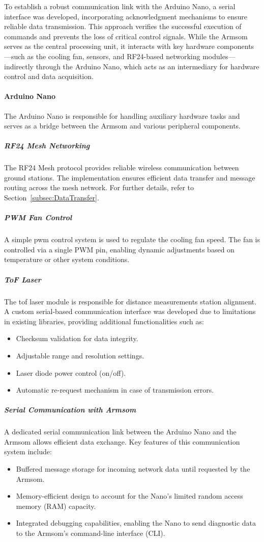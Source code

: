 To establish a robust communication link with the Arduino Nano, a serial interface was developed, incorporating acknowledgment mechanisms to ensure reliable data transmission. This approach verifies the successful execution of commands and prevents the loss of critical control signals. While the Armsom serves as the central processing unit, it interacts with key hardware components—such as the cooling fan, sensors, and RF24-based networking modules—indirectly through the Arduino Nano, which acts as an intermediary for hardware control and data acquisition.

\paragraph{Arduino Nano}
The Arduino Nano is responsible for handling auxiliary hardware tasks and serves as a bridge between the Armsom and various peripheral components.

\subparagraph{RF24 Mesh Networking}
The RF24 Mesh protocol provides reliable wireless communication between ground stations. The implementation ensures efficient data transfer and message routing across the mesh network. For further details, refer to Section~\ref{subsec:DataTransfer}.

\subparagraph{PWM Fan Control}
A simple \acrshort{pwm} control system is used to regulate the cooling fan speed. The fan is controlled via a single PWM pin, enabling dynamic adjustments based on temperature or other system conditions.

\subparagraph{ToF Laser}
The \acrshort{tof} laser module is responsible for distance measurements station alignment. A custom serial-based communication interface was developed due to limitations in existing libraries, providing additional functionalities such as:
\begin{itemize}
	\item Checksum validation for data integrity.
	\item Adjustable range and resolution settings.
	\item Laser diode power control (on/off).
	\item Automatic re-request mechanism in case of transmission errors.
\end{itemize}

\subparagraph{Serial Communication with Armsom}
A dedicated serial communication link between the Arduino Nano and the Armsom allows efficient data exchange. Key features of this communication system include:
\begin{itemize}
	\item Buffered message storage for incoming network data until requested by the Armsom.
	\item Memory-efficient design to account for the Nano’s limited random access memory (RAM) capacity.
	\item Integrated debugging capabilities, enabling the Nano to send diagnostic data to the Armsom’s command-line interface (CLI).
\end{itemize}

